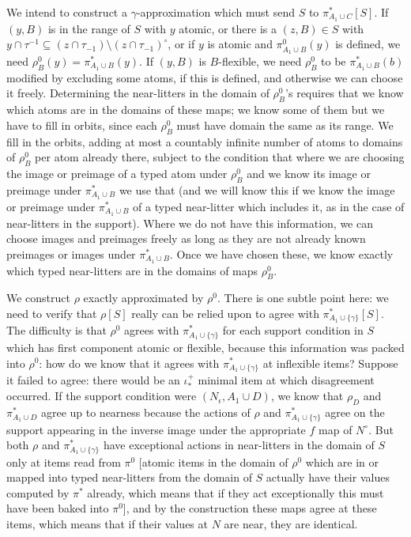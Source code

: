 \documentclass[112pt]{article}
\begin{document}
\begin{description}
We intend to construct a $\gamma$-approximation which must send $S$ to  $\pi_{A_1 \cup C}^*[S]$.  If $(y,B)$ is in the range of $S$ with $y$ atomic, 
or there is a $(z,B)\in S$ with $y \cap \tau^{-1} \subseteq (z\cap \tau_{-1}) \setminus (z\cap \tau_{-1})^\circ$, or if  $y$ is atomic and $\pi_{A_1 \cup B}^0(y)$ is defined,
we need $\rho^0_B(y) = \pi_{A_1 \cup B}^*(y)$.  If $(y,B)$ is $B$-flexible, we need $\rho^0_B$ to be $\pi_{A_1 \cup B}^*(b)$ modified by excluding some atoms, if this is defined, and otherwise we can choose it freely.  Determining the near-litters in the domain of $\rho^0_B$'s requires that we know which atoms are in the domains of these maps;  we know some of them but we have to fill in orbits, since each $\rho^0_B$ must have domain the same as its range.  We fill in the orbits, adding at most a countably infinite number of atoms to domains of $\rho^0_B$ per atom already there, subject to the condition that where we are choosing the image or preimage of a typed atom under $\rho^0_B$ and we know  its image or preimage under $\pi_{A_1 \cup B}^*$ we use that (and we will know this if
we know the image or preimage under $\pi_{A_1 \cup B}^*$ of a typed near-litter which includes it, as in the case of near-litters in the support).  Where we do not have this information, we can choose
images and preimages freely as long as they are not already known preimages or images under $\pi_{A_1 \cup B}^*$.  Once we have chosen these, we know exactly which typed near-litters are in the domains of maps $\rho^0_B$.

We construct $\rho$ exactly approximated by $\rho^0$.  There is one subtle point here:  we need to verify that $\rho[S]$ really can be relied upon to agree with $\pi^*_{A_1 \cup \{\gamma\}}[S]$.  The difficulty
is that $\rho^0$ agrees with $\pi^*_{A_1 \cup \{\gamma\}}$ for each support condition in $S$ which has first component atomic or flexible, because this information was packed into $\rho^0$:  how do we know that it agrees with $\pi^*_{A_1 \cup \{\gamma\}}$  at inflexible items?  Suppose it failed to agree:  there would be an $\iota^+_*$ minimal item at which
disagreement occurred.  If the support condition were $(N_\epsilon,A_1 \cup D)$, we know that $\rho_D$ and $\pi^*_{A_1 \cup D}$ agree up to nearness
because the actions of $\rho$ and  $\pi^*_{A_1 \cup \{\gamma\}}$ agree on the support appearing in the inverse image under the appropriate $f$ map
of $N^\circ$.  But both $\rho$ and  $\pi^*_{A_1 \cup \{\gamma\}}$ have exceptional actions in near-litters in the domain of $S$ only at items read from $\pi^0$ [atomic items in the domain of $\rho^0$ which are in or mapped into typed near-litters from the domain of $S$ actually have their values computed by $\pi^*$ already, which means that if they act exceptionally this must have been baked into $\pi^0$], and by the construction these maps agree at these items, which means that if their values at $N$ are near, they are identical.


\end{description}
\end{document}
